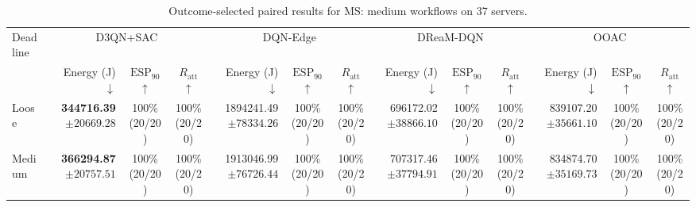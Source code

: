 \begin{table}[!t]
\centering
\caption{Outcome-selected paired results for MS: medium workflows on 37 servers.}
\label{tab:conditional_case_ms}
\begingroup
\footnotesize
\setlength{\tabcolsep}{2.2pt}
\renewcommand{\arraystretch}{1.08}
\begin{tabular}{@{}l*{4}{rcc}@{}}
\toprule
Deadline & \multicolumn{3}{c}{D3QN+SAC} & \multicolumn{3}{c}{DQN-Edge} & \multicolumn{3}{c}{DReaM-DQN} & \multicolumn{3}{c}{OOAC} \\
\cmidrule(lr){2-4}\cmidrule(lr){5-7}\cmidrule(lr){8-10}\cmidrule(lr){11-13}
 & Energy (J) $\downarrow$ & $\mathrm{ESP}_{90}$ $\uparrow$ & $R_{\mathrm{att}}$ $\uparrow$ & Energy (J) $\downarrow$ & $\mathrm{ESP}_{90}$ $\uparrow$ & $R_{\mathrm{att}}$ $\uparrow$ & Energy (J) $\downarrow$ & $\mathrm{ESP}_{90}$ $\uparrow$ & $R_{\mathrm{att}}$ $\uparrow$ & Energy (J) $\downarrow$ & $\mathrm{ESP}_{90}$ $\uparrow$ & $R_{\mathrm{att}}$ $\uparrow$ \\
\midrule
Loose & \shortstack[r]{\textbf{344716.39}\\$\pm 20669.28$} & \shortstack[c]{100\%\\(20/20)} & \shortstack[c]{100\%\\(20/20)} & \shortstack[r]{1894241.49\\$\pm 78334.26$} & \shortstack[c]{100\%\\(20/20)} & \shortstack[c]{100\%\\(20/20)} & \shortstack[r]{696172.02\\$\pm 38866.10$} & \shortstack[c]{100\%\\(20/20)} & \shortstack[c]{100\%\\(20/20)} & \shortstack[r]{839107.20\\$\pm 35661.10$} & \shortstack[c]{100\%\\(20/20)} & \shortstack[c]{100\%\\(20/20)} \\
Medium & \shortstack[r]{\textbf{366294.87}\\$\pm 20757.51$} & \shortstack[c]{100\%\\(20/20)} & \shortstack[c]{100\%\\(20/20)} & \shortstack[r]{1913046.99\\$\pm 76726.44$} & \shortstack[c]{100\%\\(20/20)} & \shortstack[c]{100\%\\(20/20)} & \shortstack[r]{707317.46\\$\pm 37794.91$} & \shortstack[c]{100\%\\(20/20)} & \shortstack[c]{100\%\\(20/20)} & \shortstack[r]{834874.70\\$\pm 35169.73$} & \shortstack[c]{100\%\\(20/20)} & \shortstack[c]{100\%\\(20/20)} \\

\end{tabular}
\end{table}
